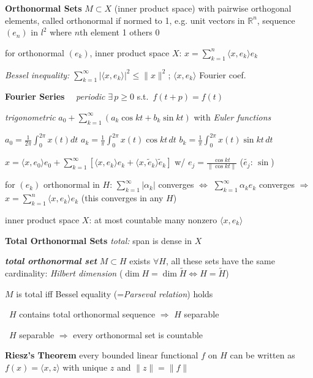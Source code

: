 \documentclass[8pt,twoside]{extarticle}
\begin{document}
\begin{multicols}{2}
\textbf{Orthonormal Sets} $M\subset X$ (inner product space) with pairwise orthogonal elements, called orthonormal if normed to 1, e.g. unit vectors in $\mathbb{R}^n$, sequence $(e_n)$ in $l^2$ where $n$th element 1 others 0

for orthonormal $(e_k)$, inner product space $X$: $x=\sum_{k=1}^n \langle x,e_k\rangle e_k$

\textit{Bessel inequality:} $\sum_{k=1}^\infty|\langle x, e_k\rangle |^2\leq \|x\|^2$; \hfill $\langle x, e_k\rangle$ Fourier coef.

\textbf{Fourier Series} \ \ \textit{periodic} $\exists\, p{\geq} 0$ s.t.\  $f(t{+}p)=f(t)$

\textit{trigonometric} $a_0{+}\!\sum_{k=1}^\infty(a_k\!\cos kt{+}b_k\!\sin kt)$ with \textit{Euler functions}

\textbullet $a_0{=}\frac{1}{2\pi}\!\int_0^{2\pi}\!x(t)dt$ \textbullet $a_k{=}\frac{1}{\pi}\!\int_0^{2\pi}\!x(t) \cos kt\,dt$ \textbullet $b_k{=}\frac{1}{\pi}\!\int_0^{2\pi}\!x(t) \sin kt \,dt$

$x{=}\langle x, e_0\rangle e_0 {+} \sum_{k=1}^\infty\left[\langle x,e_k\rangle e_k{+} \langle x, \tilde{e}_k\rangle\tilde{e}_k\right]$ w/ $e_j{=}\frac{\cos kt}{\|\cos kt\|}$ ($\tilde{e_j}$: $\sin$)


for $(e_k)$ orthonormal in $H$: 
$\sum_{k=1}^\infty |\alpha_k|$ converges $\Leftrightarrow$ 
$\sum_{k=1}^\infty \alpha_k e_k$ converges $\Rightarrow$ $x{=}\sum_{k=1}^n \langle x, e_k\rangle e_k$ (this converges in any $H$)

inner product space $X$: at most countable many nonzero $\langle x, e_k\rangle$

\textbf{Total Orthonormal Sets} \textit{total:} span is dense in $X$

\textbf{\textit{total orthonormal set}} $M{\subset} H$  exists $\forall H$, all these sets have the same cardinality:  \textit{Hilbert dimension} ($\dim H{=}\dim \tilde{H} \Leftrightarrow H{=}\tilde{H}$)

$M$ is total iff Bessel equality (=\textit{Parseval relation}) holds

\textbullet\ $H$ contains total orthonormal sequence $\Rightarrow$ $H$ separable 

\textbullet\ $H$ separable $\Rightarrow$ every orthonormal set is countable

\textbf{Riesz's Theorem} 
every bounded linear functional $f$ on $H$ can be written as $f(x)=\langle x, z \rangle$ with unique $z$ and $\|z\|=\|f\|$


\end{multicols}
\end{document}
